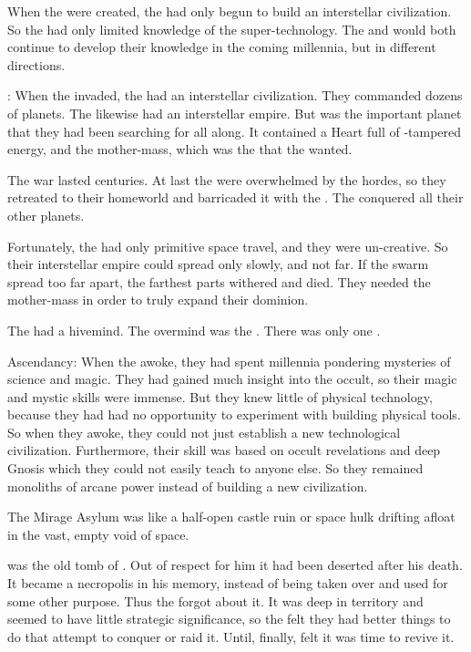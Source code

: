 When the \dragons were created, the \ophidians had only begun to build an interstellar civilization. 
So the \dragons had only limited knowledge of the \ophidian super-technology.
The \dragons and \ophidians would both continue to develop their knowledge in the coming millennia, but in different directions. 

\Firstbanewar:
  When the \banes invaded, the \ophidians had an interstellar civilization.
  They commanded dozens of planets. 
  The \banes likewise had an interstellar empire. 
  But \Miith was the important planet that they had been searching for all along. 
  It contained a Heart full of \voyager-tampered energy, and the \noggyal mother-mass, which was the  that the \banes wanted. 
  
  The war lasted centuries. 
  At last the \ophidians were overwhelmed by the \bane hordes, so they retreated to their homeworld and barricaded it with the \CrystalSphere. 
  The \banes conquered all their other planets. 
  
  Fortunately, the \banes had only primitive space travel, and they were un-creative.
  So their interstellar empire could spread only slowly, and not far.
  If the \bane swarm spread too far apart, the farthest parts withered and died.
  They needed the \noggyal mother-mass in order to truly expand their dominion. 
  
  The \banes had a hivemind. 
  The overmind was the \baneking \Voidbringer.
  There was only one \baneking. 

\Draconian Ascendancy:
  When the \dragons awoke, they had spent millennia pondering mysteries of science and magic. 
  They had gained much insight into the occult, so their magic and mystic skills were immense. 
  But they knew little of physical technology, because they had had no opportunity to experiment with building physical tools. 
  So when they awoke, they could not just establish a new technological civilization. 
  Furthermore, their skill was based on occult revelations and deep Gnosis which they could not easily teach to anyone else. 
  So they remained monoliths of arcane power instead of building a new civilization. 


The Mirage Asylum was like a half-open castle ruin or space hulk drifting afloat in the vast, empty void of space. 


\Nithdornazsh was the old tomb of \Nexagglachel. 
Out of respect for him it had been deserted after his death. 
It became a necropolis in his memory, instead of being taken over and used for some other purpose. 
Thus the \resphain forgot about it. 
It was deep in \draconic territory and seemed to have little strategic significance, so the \resphain felt they had better things to do that attempt to conquer or raid it.
Until, finally, \Secherdamon felt it was time to revive it. 



